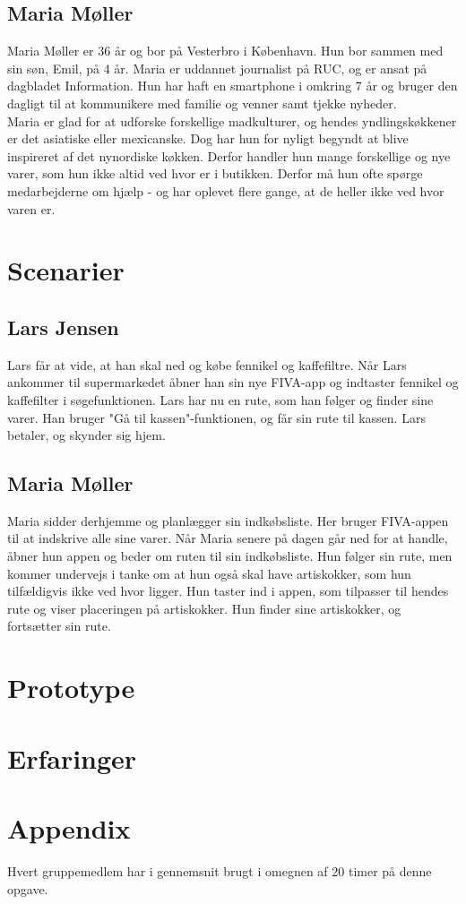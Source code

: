 \documentclass[12pt]{article}
\begin{document}
\subsection{Maria Møller}

\noindent Maria Møller er 36 år og bor på Vesterbro i København. Hun bor sammen med sin søn, Emil, på 4 år. Maria er uddannet journalist på RUC, og er ansat på dagbladet Information. Hun har haft en smartphone i omkring 7 år og bruger den dagligt til at kommunikere med familie og venner samt tjekke nyheder.\\

\noindent Maria er glad for at udforske forskellige madkulturer, og hendes yndlingskøkkener er det asiatiske eller mexicanske. Dog har hun for nyligt begyndt at blive inspireret af det nynordiske køkken. Derfor handler hun mange forskellige og nye varer, som hun ikke altid ved hvor er i butikken. Derfor må hun ofte spørge medarbejderne om hjælp - og har oplevet flere gange, at de heller ikke ved hvor varen er.

\section{Scenarier}

\subsection{Lars Jensen}
Lars får at vide, at han skal ned og købe fennikel og kaffefiltre. Når Lars ankommer til supermarkedet åbner han sin nye FIVA-app og indtaster fennikel og kaffefilter i søgefunktionen. Lars har nu en rute, som han følger og finder sine varer. Han bruger "Gå til kassen"-funktionen, og får sin rute til kassen. Lars betaler, og skynder sig hjem.

\subsection{Maria Møller}
Maria sidder derhjemme og planlægger sin indkøbsliste. Her bruger FIVA-appen til at indskrive alle sine varer. Når Maria senere på dagen går ned for at handle, åbner hun appen og beder om ruten til sin indkøbsliste. Hun følger sin rute, men kommer undervejs i tanke om at hun også skal have artiskokker, som hun tilfældigvis ikke ved hvor ligger. Hun taster ind i appen, som tilpasser til hendes rute og viser placeringen på artiskokker. Hun finder sine artiskokker, og fortsætter sin rute.

\newpage

\section{Prototype}
\newpage

\section{Erfaringer}

\section{Appendix}

Hvert gruppemedlem har i gennemsnit brugt i omegnen af 20 timer på denne opgave.
\end{document}

